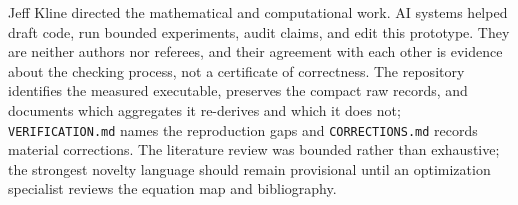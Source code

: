 \documentclass[11pt]{article}
\newcommand{\code}[1]{\texttt{#1}}
\begin{document}
Jeff Kline directed the mathematical and computational work. AI systems helped draft code, run bounded experiments, audit claims, and edit this prototype. They are neither authors nor referees, and their agreement with each other is evidence about the checking process, not a certificate of correctness. The repository identifies the measured executable, preserves the compact raw records, and documents which aggregates it re-derives and which it does not; \code{VERIFICATION.md} names the reproduction gaps and \code{CORRECTIONS.md} records material corrections. The literature review was bounded rather than exhaustive; the strongest novelty language should remain provisional until an optimization specialist reviews the equation map and bibliography.


\renewcommand{\bibfont}{\footnotesize}
\setlength{\bibsep}{2pt plus 0.3ex}

\end{document}
